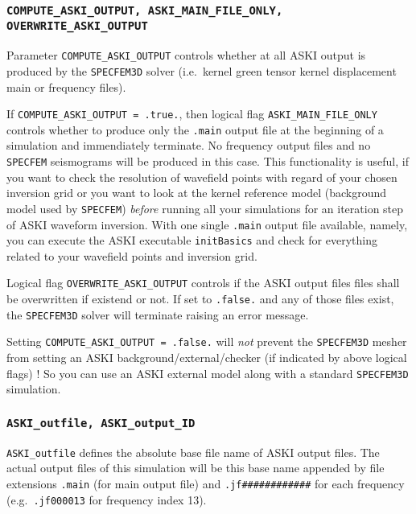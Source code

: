 \documentclass[12pt,a4paper]{article}
\newcommand{\lcode}[1]{\nolinkurl{#1}}
\newcommand{\ASKI}{ {\ttfamily ASKI} }
\begin{document}
\subsubsection*{\lcode{COMPUTE_ASKI_OUTPUT, ASKI_MAIN_FILE_ONLY, OVERWRITE_ASKI_OUTPUT}}
Parameter \lcode{COMPUTE_ASKI_OUTPUT} controls whether at all \ASKI output is produced by the \lcode{SPECFEM3D} 
solver (i.e.\ kernel green tensor kernel displacement main or frequency files). 

If \lcode{COMPUTE_ASKI_OUTPUT = .true.}, then logical flag \lcode{ASKI_MAIN_FILE_ONLY} controls whether to
produce only the \lcode{.main} output file at the beginning of a simulation and immendiately terminate. No
frequency output files and no \lcode{SPECFEM} seismograms will be produced in this case. This functionality
is useful, if you want to check the resolution of wavefield points with regard of your chosen inversion grid 
or you want to look at the kernel reference model (background model used by \lcode{SPECFEM}) \emph{before}
running all your simulations for an iteration step of \ASKI waveform inversion. With one single \lcode{.main}
output file available, namely, you can execute the \ASKI executable \lcode{initBasics} and check for everything
related to your wavefield points and inversion grid.

Logical flag \lcode{OVERWRITE_ASKI_OUTPUT} controls if the \ASKI output files files shall be overwritten if 
existend or not. If set to \lcode{.false.} and any of those files exist, the \lcode{SPECFEM3D} solver will 
terminate raising an error message.

Setting \lcode{COMPUTE_ASKI_OUTPUT = .false.} will \emph{not} prevent the \lcode{SPECFEM3D} mesher from
setting an \ASKI background/external/checker (if indicated by above logical flags) ! So you can
use an \ASKI external model along with a standard \lcode{SPECFEM3D} simulation.

\subsubsection*{\lcode{ASKI_outfile, ASKI_output_ID}}
\lcode{ASKI_outfile} defines the absolute base file name of \ASKI output files.
The actual output files of this simulation will be this base name appended by file extensions
\lcode{.main} (for main output file) and \lcode{.jf############} for each frequency (e.g.\ \lcode{.jf000013} for 
frequency index 13).
\end{document}
